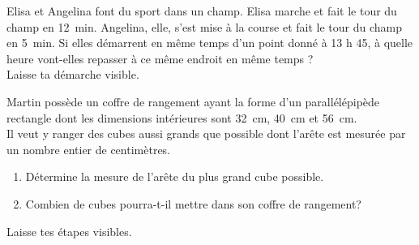 \begin{exercise}[points=2]
    Elisa et Angelina font du sport dans un champ. Elisa marche et fait le tour du champ en \SI{12}{min}. Angelina, elle, s’est mise à la course et fait le tour du champ en \SI{5}{min}. Si elles démarrent en même temps d’un point donné à 13 h 45, à quelle heure vont-elles repasser à ce même endroit en même temps ?\\
    Laisse ta démarche visible.
\end{exercise}
\begin{solution}

\end{solution}

\vspace{7cm}


\newpage
\begin{exercise}[points=3]
    Martin possède un coffre de rangement ayant la forme d’un parallélépipède rectangle dont les dimensions intérieures sont \SI{32}{cm}, \SI{40}{cm} et \SI{56}{cm}. \\
Il veut y ranger des cubes aussi grands que possible dont l’arête est mesurée par un nombre entier de centimètres.
\begin{enumerate}
    \item Détermine la mesure de l'arête du plus grand cube possible.
    \item Combien de cubes pourra-t-il mettre dans son coffre de rangement?
\end{enumerate}
Laisse tes étapes visibles.
\end{exercise}
\begin{solution}
    
\end{solution}


